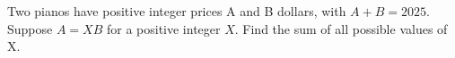Two pianos have positive integer prices A and B dollars, with $A+B=2025$. Suppose $A=XB$ for a positive integer $X$. Find the sum of all possible values of X.

